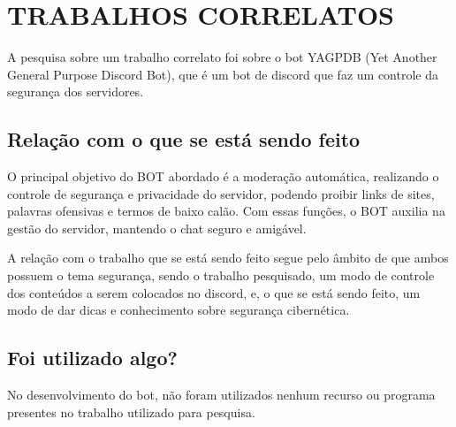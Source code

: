 \chapter{\uppercase{Trabalhos Correlatos}}
\label{referencial}

A pesquisa sobre um trabalho correlato foi sobre o bot YAGPDB (Yet Another General Purpose Discord Bot), que é um bot de discord que faz um controle da segurança dos servidores.

\section{Relação com o que se está sendo feito}

O principal objetivo do BOT abordado é a moderação automática, realizando o controle de segurança e privacidade do servidor, podendo proibir links de sites, palavras ofensivas e termos de baixo calão. Com essas funções, o BOT auxilia na gestão do servidor, mantendo o chat seguro e amigável.

A relação com o trabalho que se está sendo feito segue pelo âmbito de que ambos possuem o tema segurança, sendo o trabalho pesquisado, um modo de controle dos conteúdos a serem colocados no discord, e, o que se está sendo feito, um modo de dar dicas e conhecimento sobre segurança cibernética.

\section{Foi utilizado algo?}
 
No desenvolvimento do bot, não foram utilizados nenhum recurso ou programa presentes no trabalho utilizado para pesquisa.


